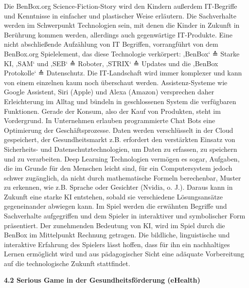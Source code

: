 \documentclass[
  a4paper,
  DIV=11,
  numbers=noendperiod,
  onecolumn,
  oneside,
  a4paper]{scrartcl}
\begin{document}
Die BenBox.org Science-Fiction-Story wird den Kindern außerdem
IT-Begriffe und Kenntnisse in einfacher und plastischer Weise erläutern.
Die Sachverhalte werden im Schwerpunkt Technologien sein, mit denen die
Kinder in Zukunft in Berührung kommen werden, allerdings auch
gegenwärtige IT-Produkte. Eine nicht abschließende Aufzählung von IT
Begriffen, vorrangführt von dem BenBox.org Spielelement, das diese
Technologie verkörpert: ‚BenBox` ≙ Starke KI, ‚SAM` und ‚SEB` ≙ Roboter,
‚STRIX` ≙ Updates und die ‚BenBox Protokolle` ≙ Datenschutz. Die
IT-Landschaft wird immer komplexer und kann von einem einzelnen kaum
noch überschaut werden. Assistenz-Systeme wie Google Assistent, Siri
(Apple) und Alexa (Amazon) versprechen daher Erleichterung im Alltag und
bündeln in geschlossenen System die verfügbaren Funktionen. Gerade der
Konsum, also der Kauf von Produkten, steht im Vordergrund. In
Unternehmen erlauben programmierte Chat Bots eine Optimierung der
Geschäftsprozesse. Daten werden verschlüsselt in der Cloud gespeichert,
der Gesundheitsmarkt z.B. erfordert den verstärkten Einsatz von
Sicherheits- und Datenschutztechnologien, um Daten zu erfassen, zu
speichern und zu verarbeiten. Deep Learning Technologien vermögen es
sogar, Aufgaben, die im Grunde für den Menschen leicht sind, für ein
Computersystem jedoch schwer zugänglich, da nicht durch mathematische
Formeln berechenbar, Muster zu erkennen, wie z.B. Sprache oder Gesichter
(Nvidia, o. J.). Daraus kann in Zukunft eine starke KI entstehen, sobald
sie verschiedene Lösungsansätze gegeneinander abwiegen kann. Im Spiel
werden die erwähnten Begriffe und Sachverhalte aufgegriffen und dem
Spieler in interaktiver und symbolischer Form präsentiert. Der
zunehmenden Bedeutung von KI, wird im Spiel durch die BenBox im
Mittelpunkt Rechnung getragen. Die bildliche, linguistische und
interaktive Erfahrung des Spielers lässt hoffen, dass für ihn ein
nachhaltiges Lernen ermöglicht wird und aus pädagogischer Sicht eine
adäquate Vorbereitung auf die technologische Zukunft stattfindet.

\textbf{4.2 Serious Game in der Gesundheitsförderung (eHealth)}
\end{document}
